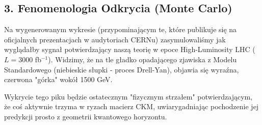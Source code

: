\documentclass[11pt,a4paper]{article}
\begin{document}
\subsection*{3. Fenomenologia Odkrycia (Monte Carlo)}
Na wygenerowanym wykresie (przypominającym te, które publikuje się na oficjalnych prezentacjach w audytoriach CERNu) zasymulowaliśmy jak wyglądałby sygnał potwierdzający naszą teorię w epoce High-Luminosity LHC ($L = 3000$ fb$^{-1}$). Widzimy, że na tle gładko opadającego zjawiska z Modelu Standardowego (niebieskie słupki - proces Drell-Yan), objawia się wyraźna, czerwona "górka" wokół 1500 GeV.

Wykrycie tego piku będzie ostatecznym "fizycznym strzałem" potwierdzającym, że coś aktywnie trzyma w ryzach macierz CKM, uwiarygadniając pochodzenie jej predykcji prosto z geometrii kwantowego horyzontu.
\end{document}

